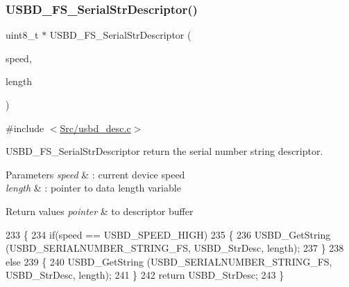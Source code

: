 \subsubsection{\texorpdfstring{U\+S\+B\+D\+\_\+\+F\+S\+\_\+\+Serial\+Str\+Descriptor()}{USBD\_FS\_SerialStrDescriptor()}}
{\footnotesize\ttfamily uint8\+\_\+t $\ast$ U\+S\+B\+D\+\_\+\+F\+S\+\_\+\+Serial\+Str\+Descriptor (\begin{DoxyParamCaption}\item[{U\+S\+B\+D\+\_\+\+Speed\+Type\+Def}]{speed,  }\item[{uint16\+\_\+t $\ast$}]{length }\end{DoxyParamCaption})}



{\ttfamily \#include $<$\mbox{\hyperlink{usbd__desc_8c}{Src/usbd\+\_\+desc.\+c}}$>$}



U\+S\+B\+D\+\_\+\+F\+S\+\_\+\+Serial\+Str\+Descriptor return the serial number string descriptor. 


\begin{DoxyParams}{Parameters}
{\em speed} & \+: current device speed \\
\hline
{\em length} & \+: pointer to data length variable \\
\hline
\end{DoxyParams}

\begin{DoxyRetVals}{Return values}
{\em pointer} & to descriptor buffer \\
\hline
\end{DoxyRetVals}

\begin{DoxyCode}
233 \{
234   \textcolor{keywordflow}{if}(speed  == USBD\_SPEED\_HIGH)
235   \{    
236     USBD\_GetString (USBD\_SERIALNUMBER\_STRING\_FS, USBD\_StrDesc, length);
237   \}
238   \textcolor{keywordflow}{else}
239   \{
240     USBD\_GetString (USBD\_SERIALNUMBER\_STRING\_FS, USBD\_StrDesc, length);    
241   \}
242   \textcolor{keywordflow}{return} USBD\_StrDesc;
243 \}
\end{DoxyCode}
